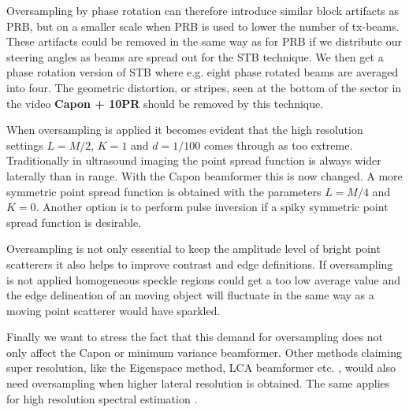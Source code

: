 \documentclass[journal]{IEEEtran}
\newcommand\multimedia[1]{\textbf{{\color{red}#1}}}
\begin{document}
Oversampling by phase rotation can therefore introduce similar block artifacts as PRB, but on a smaller scale when PRB is used to lower the number of tx-beams. These artifacts could be removed in the same way as for PRB if we distribute our steering angles as beams are spread out for the STB technique. We then get a phase rotation version of STB where e.g. eight phase rotated beams are averaged into four. The geometric distortion, or stripes, seen at the bottom of the sector in the video \multimedia{Capon + 10PR} should be removed by this technique.

When oversampling is applied it becomes evident that the high resolution settings $L=M/2$, $K=1$ and $d=1/100$ comes through as too extreme. Traditionally in ultrasound imaging the point spread function is always wider laterally than in range. With the Capon beamformer this is now changed. A more symmetric point spread function is obtained with the parameters $L=M/4$ and $K=0$. Another option is to perform pulse inversion if a spiky symmetric point spread function is desirable.

Oversampling is not only essential to keep the amplitude level of bright point scatterers it also helps to improve contrast and edge definitions. If oversampling is not applied homogeneous speckle regions could get a too low average value and the edge delineation of an moving object will fluctuate in the same way as a moving point scatterer would have sparkled.

Finally we want to stress the fact that this demand for oversampling does not only affect the Capon or minimum variance beamformer. Other methods claiming super resolution, like the Eigenspace method, LCA beamformer etc. \cite{Synnevag2011, Nilsen2009, Mehdizadeh2012a, Kim}, would also need oversampling when higher lateral resolution is obtained. The same applies for high resolution spectral estimation \cite{Ekroll2012}. 

\end{document}
